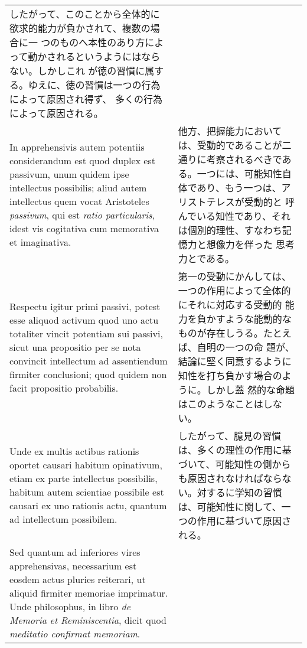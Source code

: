 \documentclass[10pt]{jsarticle} %
\begin{document}
\begin{longtable}{p{21em}p{21em}}
したがって、このことから全体的に欲求的能力が負かされて、複数の場合に一
つのものへ本性のあり方によって動かされるというようにはならない。しかしこれ
が徳の習慣に属する。ゆえに、徳の習慣は一つの行為によって原因され得ず、
 多くの行為によって原因される。

\\

In apprehensivis autem potentiis considerandum est quod duplex est
passivum, unum quidem ipse intellectus possibilis; aliud autem
intellectus quem vocat Aristoteles {\itshape passivum}, qui est
{\itshape ratio particularis}, idest vis cogitativa cum memorativa et
imaginativa.


&

他方、把握能力においては、受動的であることが二通りに考察されるべきであ
る。一つには、可能知性自体であり、もう一つは、アリストテレスが受動的と
呼んでいる知性であり、それは個別的理性、すなわち記憶力と想像力を伴った
思考力とである。

\\

Respectu igitur primi passivi, potest esse aliquod activum quod uno
actu totaliter vincit potentiam sui passivi, sicut una propositio per
se nota convincit intellectum ad assentiendum firmiter conclusioni;
quod quidem non facit propositio probabilis.


&

第一の受動にかんしては、一つの作用によって全体的にそれに対応する受動的
 能力を負かすような能動的なものが存在しうる。たとえば、自明の一つの命
 題が、結論に堅く同意するように知性を打ち負かす場合のように。しかし蓋
 然的な命題はこのようなことはしない。



\\

Unde ex multis actibus rationis oportet causari habitum opinativum,
etiam ex parte intellectus possibilis, habitum autem scientiae
possibile est causari ex uno rationis actu, quantum ad intellectum
possibilem.


&

したがって、臆見の習慣は、多くの理性の作用に基づいて、可能知性の側から
も原因されなければならない。対するに学知の習慣は、可能知性に関して、一
つの作用に基づいて原因される。

\\

Sed quantum ad inferiores vires apprehensivas, necessarium est eosdem
actus pluries reiterari, ut aliquid firmiter memoriae imprimatur. 
Unde philosophus, in libro {\itshape de Memoria et Reminiscentia}, dicit quod
{\itshape meditatio confirmat memoriam}.


\end{longtable}
\end{document}
